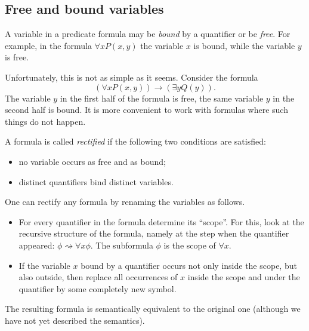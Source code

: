 \begin{page}

\subsection{Free and bound variables}
A variable in a predicate formula may be \emph{bound} by a quantifier or be \emph{free}.
For example, in the formula $\forall x P(x,y)$ the variable $x$ is bound, while the variable $y$ is free.

Unfortunately, this is not as simple as it seems.
Consider the formula
\[
(\forall x P(x,y)) \to (\exists y Q(y)).
\]
The variable $y$ in the first half of the formula is free, the same variable $y$ in the second half is bound.
It is more convenient to work with formulas where such things do not happen.


\end{page}

\begin{page}

\begin{dfn}
A formula is called \emph{rectified} if the following two conditions are satisfied:
\begin{itemize}
\item
no variable occurs as free and as bound;
\item
distinct quantifiers bind distinct variables.
\end{itemize}
\end{dfn}

\end{page}

\begin{page}


One can rectify any formula by renaming the variables as follows.
\begin{itemize}
\item
For every quantifier in the formula determine its ``scope''.
For this, look at the recursive structure of the formula,
namely at the step when the quantifier appeared: $\phi \rightsquigarrow \forall x \phi$.
The subformula $\phi$ is the scope of $\forall x$.
\item
If the variable $x$ bound by a quantifier occurs not only inside the scope,
but also outside, then replace all occurrences of $x$ inside the scope and under the quantifier by some completely new symbol.
\end{itemize}

The resulting formula is semantically equivalent to the original one (although we have not yet described the semantics).


\end{page}

